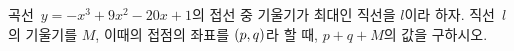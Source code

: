곡선~$y=-x^3+9x^2-20x+1$의 접선 중 기울기가 최대인 직선을 $l$이라 하자. 직선~$l$의 기울기를 $M$, 이때의 접점의 좌표를 $(p{,}\mkern3mu\mathopen{}q)$라 할 때, $p+q+M$의 값을 구하시오.
